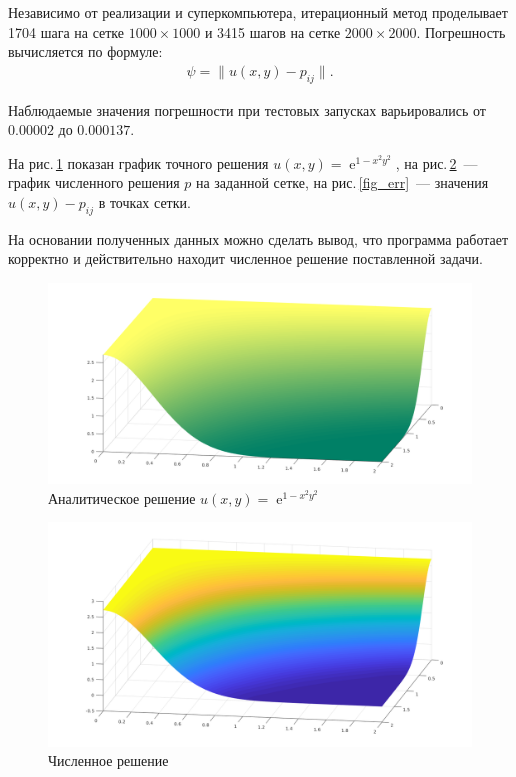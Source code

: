 \documentclass[11pt]{article}
\numberwithin{equation}{section}
\theoremstyle{plain}
\theoremstyle{definition}
\DeclareMathOperator{\expon}{e}
\begin{document}
Независимо от реализации и суперкомпьютера, итерационный метод проделывает
1704 шага на сетке $1000\times1000$ и 3415 шагов на сетке $2000\times2000$. Погрешность
вычисляется по формуле:
\[\begin{aligned}
    \psi=\|u(x,y)-p_{ij}\|.
\end{aligned}\]

Наблюдаемые значения погрешности при тестовых запусках варьировались
от $0.00002$ до $0.000137$.

На рис.\,\ref{fig_real} показан график точного решения $u(x,y)=\expon^{1-x^2y^2}$,
на рис.\,\ref{fig_calc}~--- график численного решения $p$ на заданной сетке,
на рис.\,\ref{fig_err}~--- значения $u(x,y)-p_{ij}$ в точках сетки.

На основании полученных данных можно сделать вывод, что программа работает
корректно и действительно находит численное решение поставленной задачи.

\begin{figure}[h]
    \centering
    \includegraphics[width=\textwidth]{fig_real}
    \caption{Аналитическое решение $u(x,y)=\expon^{1-x^2y^2}$}
    \label{fig_real}
\end{figure}

\begin{figure}[h]
    \centering
    \includegraphics[width=\textwidth]{fig_calc}
    \caption{Численное решение}
    \label{fig_calc}
\end{figure}
\end{document}
